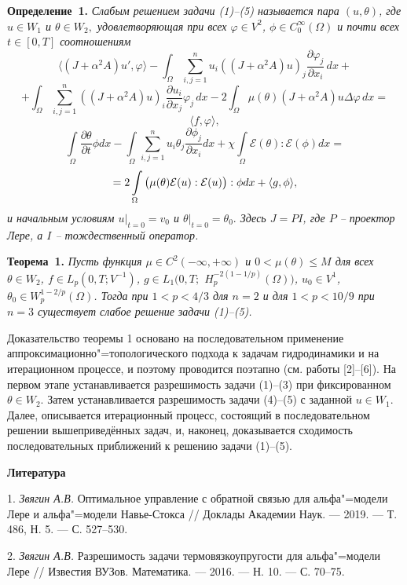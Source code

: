 \textbf{Определение~1.} {\it
	Слабым решением задачи (1)--(5) называется пара $(u, \theta)$, где $u \in W_1$ и $\theta \in W_2,$ удовлетворяющая при всех $\varphi \in V^2$, $ \phi \in C^{\infty}_0(\Omega)$ и почти всех $t\in [0,T]$ соотношениям
$$
	\langle (J+\alpha^2A)u', \varphi\rangle - \int_\Omega\sum_{i, j=1}^nu_i((J+\alpha^2A)u)_j
	\frac{\partial\varphi_j}{\partial x_i}\,dx +$$
	$$+ \int_\Omega\sum_{i, j=1}^n((J+\alpha^2A)u)_i\frac{\partial u_i}{\partial x_j}
	\varphi_j\,dx
	- 2\int_\Omega \mu(\theta) (J+\alpha^2A)u\Delta\varphi\,dx=$$
	$$
	\langle f, \varphi\rangle,$$ $$
	\int\limits_\Omega \frac{\partial\theta}{\partial t}\phi dx-\int\limits_\Omega\sum\limits_{i,j=1}^n
	u_i\theta_j\frac{\partial \phi_j}{\partial x_i} dx+\chi\int\limits_\Omega
	\mathcal{E}(\theta):\mathcal{E}( \phi) dx=$$ $$= 2\int\limits_\Omega\big{(}{\mu}(\theta) \mathcal {E}(u): \mathcal {E}(u)\big{)}:\phi dx+\langle g,\phi\rangle,\label{f4}
$$
	и начальным условиям $u|_{t=0} = v_0$ и $\theta|_{t=0}=\theta_0.$ Здесь $J=PI$, где $P$ -- проектор Лере, а $I$ -- тождественный оператор.}

\textbf{Теорема~1.} {\it Пусть функция $\mu \in C^2(-\infty,+\infty)$ и $0<\mu(\theta)\leq M$ для всех $\theta \in W_2$, $f \in L_p(0,T;V^{-1})$, $g \in L_1(0,T;$ $H^{-2(1-1/p)}_p(\Omega))$, $u_0 \in V^1$, $\theta_0 \in W^{1-2/p}_p(\Omega)$. Тогда при $1<p<4/3$ для $n=2$ и для $1<p<10/9$ при $n=3$ существует слабое решение задачи (1)--(5).}

Доказательство теоремы 1 основано на последовательном применение аппроксимационно"=топологического подхода к задачам гидродинамики и на итерационном процессе, и поэтому проводится поэтапно (см. работы [2]--[6]). На первом этапе устанавливается разрешимость задачи (1)--(3) при фиксированном $\theta \in W_2$. Затем устанавливается разрешимость задачи (4)--(5) с заданной $u \in W_1$. Далее, описывается итерационный процесс, состоящий в последовательном решении вышеприведённых задач, и, наконец, доказывается сходимость последовательных приближений к решению задачи (1)--(5).




\smallskip \centerline {\bf Литература} \nopagebreak

1. {\it Звягин А.В.} Оптимальное управление с обратной связью для альфа"=модели Лере и альфа"=модели Навье-Стокса // Доклады Академии Наук. --- 2019. --- Т. 486, Н. 5. --- С. 527--530.

2. {\it Звягин А.В.} Разрешимость задачи термовязкоупругости для альфа"=модели Лере // Известия ВУЗов. Математика. --- 2016. --- Н. 10. --- С. 70--75.

